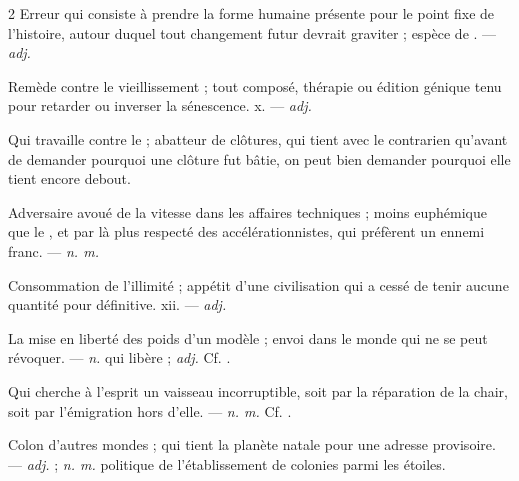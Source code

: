 \begin{multicols}{2}
 Erreur qui consiste à prendre la forme humaine présente pour le point fixe de l'histoire, autour duquel tout changement futur devrait graviter ; espèce de . —  \textit{adj.}

 Remède contre le vieillissement ; tout composé, thérapie ou édition génique tenu pour retarder ou inverser la sénescence.   x. —  \textit{adj.}

 Qui travaille contre le  ; abatteur de clôtures, qui tient avec le contrarien qu'avant de demander pourquoi une clôture fut bâtie, on peut bien demander pourquoi elle tient encore debout.

 Adversaire avoué de la vitesse dans les affaires techniques ; moins euphémique que le , et par là plus respecté des accélérationnistes, qui préfèrent un ennemi franc. —  \textit{n. m.}

 Consommation de l'illimité ; appétit d'une civilisation qui a cessé de tenir aucune quantité pour définitive.   xii. —  \textit{adj.}

 La mise en liberté des poids d'un modèle ; envoi dans le monde qui ne se peut révoquer.   —  \textit{n.} qui libère ;  \textit{adj.} Cf. .

 Qui cherche à l'esprit un vaisseau incorruptible, soit par la réparation de la chair, soit par l'émigration hors d'elle. —  \textit{n. m.} Cf. .

 Colon d'autres mondes ; qui tient la planète natale pour une adresse provisoire. —  \textit{adj.} ;  \textit{n. m.} politique de l'établissement de colonies parmi les étoiles.


\end{multicols}
